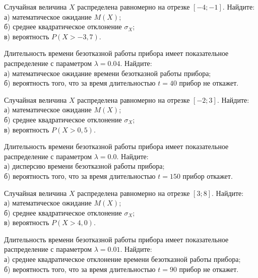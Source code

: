 \vfill

\newpage\setcounter{zad}{0}

\z Случайная величина $X$ распределена равномерно на отрезке $[-4; -1]$. Найдите: \\ \quad а) математическое ожидание $M(X)$; \\ \quad б) среднее квадратическое отклонение $\sigma_X$; \\ \quad в) вероятность $P(X>-3{,}7)$.


\vfill

\z Длительность времени безотказной работы прибора имеет показательное распределение с параметром $\lambda = 0.04$. Найдите: \\ \quad а) математическое ожидание времени безотказной работы прибора; \\ \quad б) вероятность того, что за время длительностью $t = 40$ прибор не откажет.
 

\vfill

\newpage\setcounter{zad}{0}

\z Случайная величина $X$ распределена равномерно на отрезке $[-2; 3]$. Найдите: \\ \quad а) математическое ожидание $M(X)$; \\ \quad б) среднее квадратическое отклонение $\sigma_X$; \\ \quad в) вероятность $P(X>0{,}5)$.


\vfill

\z Длительность времени безотказной работы прибора имеет показательное распределение с параметром $\lambda = 0.0$. Найдите: \\ \quad а) дисперсию времени безотказной работы прибора; \\ \quad б) вероятность того, что за время длительностью $t = 150$ прибор откажет.
 

\vfill

\newpage\setcounter{zad}{0}

\z Случайная величина $X$ распределена равномерно на отрезке $[3; 8]$. Найдите: \\ \quad а) математическое ожидание $M(X)$; \\ \quad б) среднее квадратическое отклонение $\sigma_X$; \\ \quad в) вероятность $P(X>4{,}0)$.


\vfill

\z Длительность времени безотказной работы прибора имеет показательное распределение с параметром $\lambda = 0.01$. Найдите: \\ \quad а) среднее квадратическое отклонение времени безотказной работы прибора; \\ \quad б) вероятность того, что за время длительностью $t = 90$ прибор не откажет.
 


